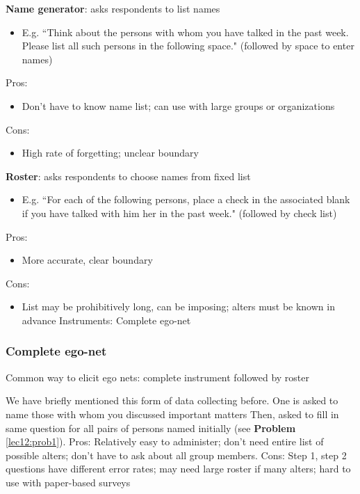 \documentclass[]{book}
\theoremstyle{definition}
\theoremstyle{definition}
\theoremstyle{definition}
\theoremstyle{remark}
\begin{document}
\begin{multicols}{2}
\noindent
\textbf{Name generator}: asks 
respondents to list names 
\begin{itemize}
\item E.g. ``Think about the persons 
with whom you have talked in 
the past week.  Please list all 
such persons in the following 
space." (followed by space to 
enter names) 
\end{itemize}

\noindent
Pros: 
\begin{itemize}
\item Don't have to know name list; 
can use with large groups or 
organizations 
\end{itemize}

\noindent
Cons: 
\begin{itemize}
\item High rate of forgetting; unclear 
boundary 
\end{itemize}

\noindent
\textbf{Roster}: asks respondents 
to choose names from 
fixed list 
\begin{itemize}
\item E.g. ``For each of the following 
persons, place a check in the 
associated blank if you have 
talked with him her in the past 
week." (followed by check list) 
\end{itemize}

\noindent
Pros: 
\begin{itemize}
\item More accurate, clear boundary 
\end{itemize}


\noindent
Cons: 
\begin{itemize}
\item List may be prohibitively long, 
can be imposing; alters must 
be known in advance
Instruments: Complete ego-net 
\end{itemize}
\end{multicols}

\subsubsection{Complete ego-net}

Common way to elicit ego nets: complete instrument followed by roster

We have briefly mentioned this form of data collecting before. One is
asked to name those with whom you discussed important matters Then,
asked to fill in same question for all pairs of persons named initially
(see \textbf{Problem} \ref{lec12:prob1}). Pros: Relatively easy to
administer; don't need entire list of possible alters; don't have to ask
about all group members. Cons: Step 1, step 2 questions have different
error rates; may need large roster if many alters; hard to use with
paper-based surveys
\end{document}
